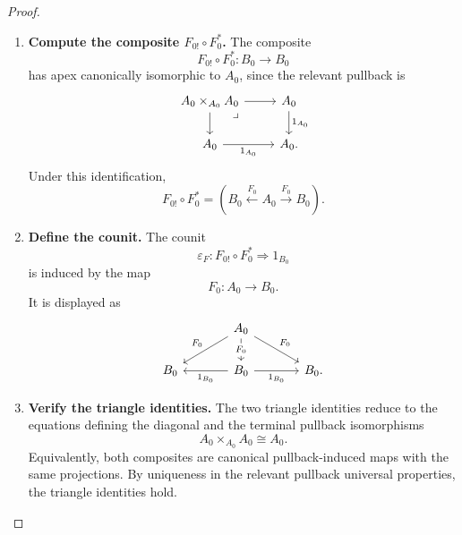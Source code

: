 \begin{proof}
\begin{enumerate}
        \item \textbf{Compute the composite \(F_{0!}\circ F_0^\ast\).} The composite
        \[
            F_{0!}\circ F_0^\ast:B_0\to B_0
        \]
        has apex canonically isomorphic to \(A_0\), since the relevant pullback is
        \[
            \begin{tikzcd}
                    A_0\times_{A_0}A_0
                        \arrow[r]
                        \arrow[d]
                        \arrow[dr, phantom, "\lrcorner", very near start]
                &
                    A_0 
                        \arrow[d, "1_{A_0}"]
                \\
                    A_0 
                        \arrow[r, "1_{A_0}"']
                &
                    A_0.
            \end{tikzcd}
        \]
        Under this identification,
        \[
            F_{0!}\circ F_0^\ast
            =
            \left(
                B_0
                \xleftarrow{F_0}
                A_0
                \xrightarrow{F_0}
                B_0
            \right).
        \]

        \item \textbf{Define the counit.} The counit
        \[
            \varepsilon_F:F_{0!}\circ F_0^\ast\Rightarrow 1_{B_0}
        \]
        is induced by the map
        \[
            F_0:A_0\to B_0.
        \]
        It is displayed as
        \[
            \begin{tikzcd}[column sep=large]
                & 
                    A_0 
                        \arrow[d, "F_0" description] 
                        \arrow[dl, "F_0"'] 
                        \arrow[dr, "F_0"] 
                & 
                \\
                    B_0 
                & 
                    B_0 
                        \arrow[l, "1_{B_0}"] 
                        \arrow[r, "1_{B_0}"'] 
                & 
                    B_0.
            \end{tikzcd}
        \]

        \item \textbf{Verify the triangle identities.} The two triangle identities reduce to the equations defining the diagonal and the terminal pullback isomorphisms
        \[
            A_0\times_{A_0}A_0\cong A_0.
        \]
        Equivalently, both composites are canonical pullback-induced maps with the same projections. By uniqueness in the relevant pullback universal properties, the triangle identities hold.
    \end{enumerate}
\end{proof}

